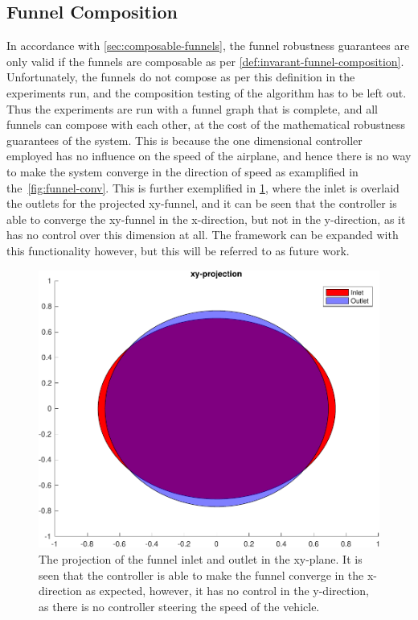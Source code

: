 \subsection{Funnel Composition}
\label{subsec:funnel-no-composable}

In accordance with \cref{sec:composable-funnels}, the funnel robustness
guarantees are only valid if the funnels are composable as per
\cref{def:invarant-funnel-composition}. Unfortunately, the funnels do not
compose as per this definition in the experiments run, and the composition
testing of the algorithm has to be left out. Thus the experiments are run with a
funnel graph that is complete, and all funnels can compose with each other, at
the cost of the mathematical robustness guarantees of the system. This is
because the one dimensional controller employed has no influence on the speed of
the airplane, and hence there is no way to make the system converge in the
direction of speed as examplified in the~\cref{fig:funnel-conv}. This is further
exemplified in \cref{fig:funnel-inlet-outlet}, where the inlet is overlaid the
outlets for the projected xy-funnel, and it can be seen that the controller is
able to converge the xy-funnel in the x-direction, but not in the y-direction,
as it has no control over this dimension at all. The framework can be expanded
with this functionality however, but this will be referred to as future work.

\begin{figure}[!t]
  \centering
  \includegraphics[width=.8\columnwidth]{figures/experiments/funnel-inlet-outlet}
  \caption[The projection of the funnel inlet and outlet in the xy-plane]{The projection of the funnel inlet and outlet in the xy-plane. It is
    seen that the controller is able to make the funnel converge in the
    x-direction as expected, however, it has no control in the y-direction, as
    there is no controller steering the speed of the vehicle.}
  \label{fig:funnel-inlet-outlet}
\end{figure}

